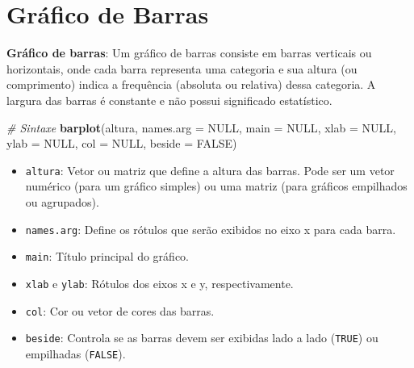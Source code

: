 \documentclass[
]{book}
\newenvironment{Shaded}{\begin{snugshade}}{\end{snugshade}}
\newcommand{\AttributeTok}[1]{\textcolor[rgb]{0.13,0.29,0.53}{#1}}
\newcommand{\CommentTok}[1]{\textcolor[rgb]{0.56,0.35,0.01}{\textit{#1}}}
\newcommand{\ConstantTok}[1]{\textcolor[rgb]{0.56,0.35,0.01}{#1}}
\newcommand{\FunctionTok}[1]{\textcolor[rgb]{0.13,0.29,0.53}{\textbf{#1}}}
\newcommand{\NormalTok}[1]{#1}
\providecommand{\tightlist}{%
  \setlength{\itemsep}{0pt}\setlength{\parskip}{0pt}}
\begin{document}
\section{Gráfico de Barras}\label{gruxe1fico-de-barras}

\textbf{Gráfico de barras}: Um gráfico de barras consiste em barras verticais
ou horizontais, onde cada barra representa uma categoria e sua altura
(ou comprimento) indica a frequência (absoluta ou relativa) dessa
categoria. A largura das barras é constante e não possui significado
estatístico.

\begin{Shaded}
\begin{Highlighting}[]
\CommentTok{\# Sintaxe }
\FunctionTok{barplot}\NormalTok{(altura, }
        \AttributeTok{names.arg =} \ConstantTok{NULL}\NormalTok{, }
        \AttributeTok{main =} \ConstantTok{NULL}\NormalTok{, }
        \AttributeTok{xlab =} \ConstantTok{NULL}\NormalTok{, }
        \AttributeTok{ylab =} \ConstantTok{NULL}\NormalTok{, }
        \AttributeTok{col =} \ConstantTok{NULL}\NormalTok{, }
        \AttributeTok{beside =} \ConstantTok{FALSE}\NormalTok{)}
\end{Highlighting}
\end{Shaded}

\begin{itemize}
\tightlist
\item
  \texttt{altura}: Vetor ou matriz que define a altura das barras. Pode ser um vetor numérico (para um gráfico simples) ou uma matriz (para gráficos empilhados ou agrupados).
\item
  \texttt{names.arg}: Define os rótulos que serão exibidos no eixo x para cada barra.
\item
  \texttt{main}: Título principal do gráfico.
\item
  \texttt{xlab} e \texttt{ylab}: Rótulos dos eixos x e y, respectivamente.
\item
  \texttt{col}: Cor ou vetor de cores das barras.
\item
  \texttt{beside}: Controla se as barras devem ser exibidas lado a lado (\texttt{TRUE}) ou empilhadas (\texttt{FALSE}).
\end{itemize}
\end{document}
